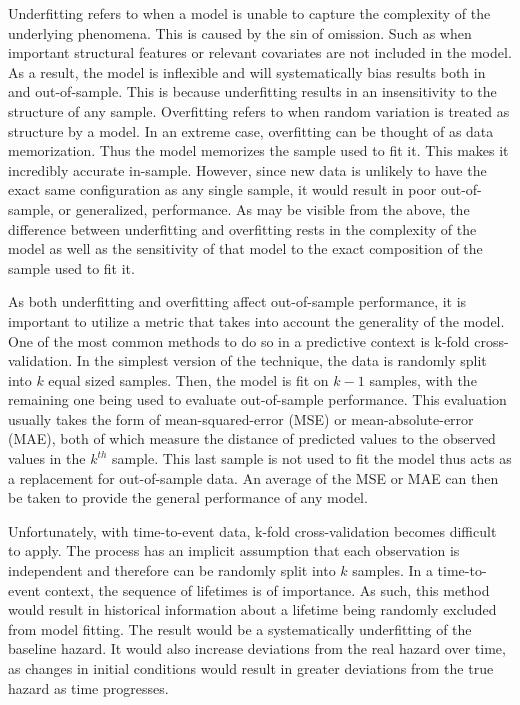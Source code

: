 Underfitting refers to when a model is unable to capture the complexity of the underlying phenomena. This is caused by the sin of omission. Such as when important structural features or relevant covariates are not included in the model. As a result, the model is inflexible and will systematically bias results both in and out-of-sample. This is because underfitting results in an insensitivity to the structure of any sample. Overfitting refers to when random variation is treated as structure by a model. In an extreme case, overfitting can be thought of as data memorization. Thus the model memorizes the sample used to fit it. This makes it incredibly accurate in-sample. However, since new data is unlikely to have the exact same configuration as any single sample, it would result in poor out-of-sample, or generalized, performance. As may be visible from the above, the difference between underfitting and overfitting rests in the complexity of the model as well as the sensitivity of that model to the exact composition of the sample used to fit it\cite{McElreath2016}. 


As both underfitting and overfitting affect out-of-sample performance, it is important to utilize a metric that takes into account the generality of the model. One of the most common methods to do so in a predictive context is k-fold cross-validation. In the simplest version of the technique, the data is randomly split into $k$ equal sized samples. Then, the model is fit on $k-1$ samples, with the remaining one being used to evaluate out-of-sample performance. This evaluation usually takes the form of mean-squared-error (MSE) or mean-absolute-error (MAE), both of which measure the distance of predicted values to the observed values in the $k^{th}$ sample. This last sample is not used to fit the model thus acts as a replacement for out-of-sample data. An average of the MSE or MAE can then be taken to provide the general performance of any model. 

Unfortunately, with time-to-event data, k-fold cross-validation becomes difficult to apply. The process has an implicit assumption that each observation is independent and therefore can be randomly split into $k$ samples. In a time-to-event context, the sequence of lifetimes is of importance. As such, this method would result in historical information about a lifetime being randomly excluded from model fitting. The result would be a systematically underfitting of the baseline hazard. It would also increase deviations from the real hazard over time, as changes in initial conditions would result in greater deviations from the true hazard as time progresses.

